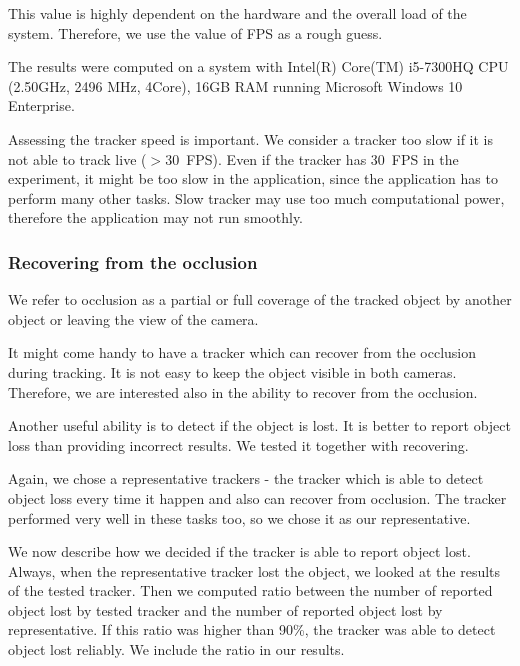 This value is highly dependent on the hardware and the overall load of the
system.  Therefore, we use the value of FPS as a rough guess.

The results were computed on a system with Intel(R) Core(TM) i5-7300HQ CPU
(2.50GHz, 2496 MHz, 4Core), 16GB RAM running Microsoft Windows 10 Enterprise.


Assessing the tracker speed is important. We consider a tracker too slow if
it is not able to track live ($>$30~FPS). Even if the tracker has 30~FPS in the
experiment, it might be too slow in the application, since the application has
to perform many other tasks. Slow tracker may use too much computational power,
therefore the application may not run smoothly.

\subsubsection*{Recovering from the occlusion}

We refer to occlusion as a partial or full coverage of the tracked object by
another object or leaving the view of the camera.

It might come handy to have a tracker which can recover from the occlusion
during tracking. It is not easy to keep the object visible in both cameras.
Therefore, we are interested also in the ability to recover from the occlusion.


Another useful ability is to detect if the object is lost. It is better to
report object loss than providing incorrect results. We tested it together with
recovering.

Again, we chose a representative trackers - the tracker which is able to
detect object loss every time it happen and also can recover from occlusion.
The \simback tracker performed very well in these tasks too, so we chose it
as our representative.

We now describe how we decided if the tracker is able to report object lost.
Always, when the representative tracker lost the object, we looked at the
results of the tested tracker. Then we computed ratio between the number of
reported object lost by tested tracker and the number of reported object lost
by representative. If this ratio was higher than 90\%, the tracker was able to
detect object lost reliably. We include the ratio in our results.


